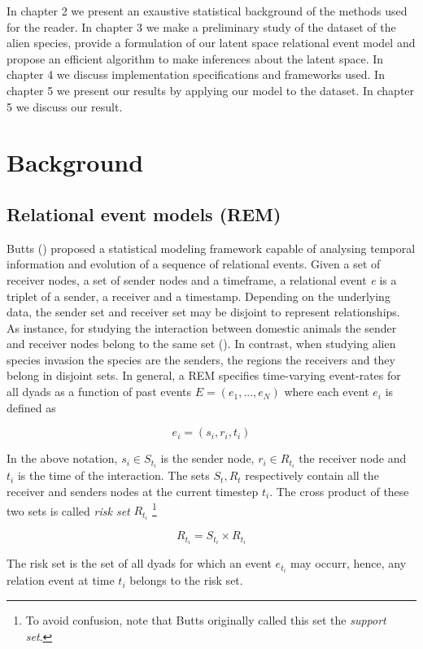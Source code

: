 \documentclass[mscthesis]{usiinfthesis}
\begin{document}
In chapter 2 we present an exaustive statistical background of the methods used for the reader. In chapter 3 we make a preliminary study of the  dataset of the alien species, provide a formulation of our latent space relational event model and propose an efficient algorithm to make inferences about the latent space. In chapter 4 we discuss implementation specifications and frameworks used. In chapter 5 we present our results by applying our model to the dataset. In chapter 5 we discuss our result.

\chapter{Background}
\section{Relational event models (REM)}

Butts (\citet{rem:butts}) proposed a statistical modeling framework capable of analysing temporal information and evolution of a sequence of relational events. Given a set of receiver nodes, a set of sender nodes and a timeframe, a relational event \textit{e} is a triplet of a sender, a receiver and a timestamp. Depending on the underlying data, the sender set and receiver set may be disjoint to represent relationships. As instance, for studying the interaction between domestic animals the sender and receiver nodes belong to the same set (\citep{intro:cattle}). In contrast, when studying alien species invasion the species are the senders, the regions the receivers and they belong in disjoint sets. In general, a REM specifies time-varying event-rates for all dyads as a function of past events $E=(e_1, ..., e_N)$ where each event $e_i$ is defined as

\[
e_i = (s_i, r_i, t_i)
\]

In the above notation, $s_i \in S_{t_i} $ is the sender node, $r_i \in R_{t_i}$ the receiver node and $t_i$ is the time of the interaction. The sets $S_t, R_t$ respectively contain all the receiver and senders nodes at the current timestep $t_i$. The cross product of these two sets is called \textit{risk set} $R_{t_i}$  \footnote{\label{riskset_footnote}To avoid confusion, note that Butts originally called this set the \textit{support set}.}



\[
R_{t_i} = S_{t_i} \times R_{t_i}
\]

The risk set is the set of all dyads for which an event $e_{t_i}$ may occurr, hence, any relation event at time $t_i$ belongs to the risk set.
\end{document}

